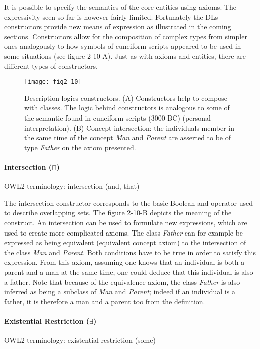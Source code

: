 It is possible to specify the semantics of the core entities using axioms. The expressivity seen so far is however fairly limited. Fortunately the DLs constructors provide new means of expression as illustrated in the coming sections. Constructors allow for the composition of complex types from simpler ones analogously to how symbols of cuneiform scripts appeared to be used in some situations (see figure 2-10-A). Just as with axioms and entities, there are different types of constructors.

\begin{figure}[ht]
    \centering
    \texttt{[image: fig2-10]}
    \caption{Description logics constructors. (A) Constructors help to compose with classes. The logic behind constructors is analogous to some of the semantic found in cuneiform scripts (3000 BC) (personal interpretation). (B) Concept intersection: the individuals member in the same time of the concept \emph{Man} and \emph{Parent} are asserted to be of type \emph{Father} on the axiom presented.}
    \label{fig2-10}
\end{figure}

\paragraph{\textbf{Intersection ($ \sqcap $)}\\}
\label{intersection}
OWL2 terminology: intersection (and, that)

The intersection constructor corresponds to the basic Boolean and operator used to describe overlapping sets. The figure 2-10-B depicts the meaning of the construct. An intersection can be used to formulate new expressions, which are used to create more complicated axioms. The class \emph{Father} can for example be expressed as being equivalent (equivalent concept axiom) to the intersection of the class \emph{Man} and \emph{Parent}. Both conditions have to be true in order to satisfy this expression. From this axiom, assuming one knows that an individual is both a parent and a man at the same time, one could deduce that this individual is also a father. Note that because of the equivalence axiom, the class \emph{Father} is also inferred as being a subclass of \emph{Man} and \emph{Parent}; indeed if an individual is a father, it is therefore a man and a parent too from the definition.

\paragraph{\textbf{Existential Restriction  ($ \exists $)}\\}
\label{exists}
OWL2 terminology: existential restriction (some)

